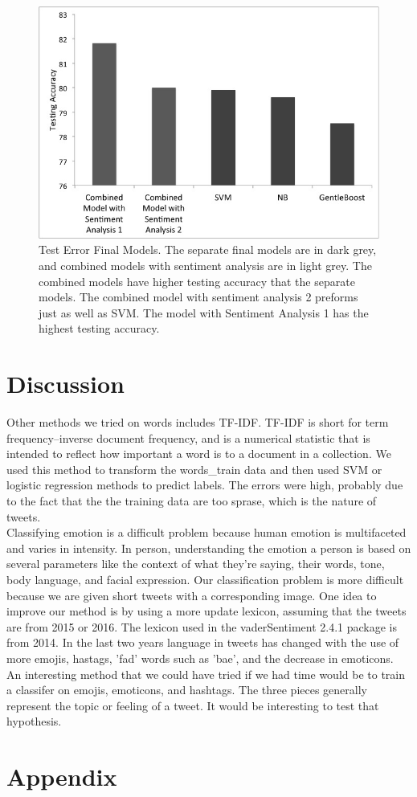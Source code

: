 \documentclass[]{article}
\begin{document}
\begin{figure}
	\centering
  \includegraphics[scale=0.4]{FinalGraph.jpg}
  \caption{Test Error Final Models. The separate final models are in dark grey, and combined models with sentiment analysis are in light grey. The combined models have higher testing accuracy that the separate models. The combined model with sentiment analysis 2 preforms just as well as SVM. The model with Sentiment Analysis 1 has the highest testing accuracy.}
  \label{fig:Test Error}
\end{figure}

\section{Discussion}

Other methods we tried on words includes TF-IDF. TF-IDF is short for term frequency–inverse document frequency, and is a numerical statistic that is intended to reflect how important a word is to a document in a collection. We used this method to transform the words\_train data and then used SVM or logistic regression methods to predict labels. The errors were high, probably due to the fact that the the training data are too sprase, which is the nature of tweets.  \\

Classifying emotion is a difficult problem because human emotion is multifaceted and varies in intensity. In person, understanding the emotion a person is based on several parameters like the context of what they're saying, their words, tone, body language, and facial expression. Our classification problem is more difficult because we are given short tweets with a corresponding image. One idea to improve our method is by using a more update lexicon, assuming that the tweets are from 2015 or 2016. The lexicon used in the vaderSentiment 2.4.1 package is from 2014. In the last two years language in tweets has changed with the use of more emojis, hastags, 'fad' words such as 'bae', and the decrease in emoticons. An interesting method that we could have tried if we had time would be to train a classifer on emojis, emoticons, and hashtags. The three pieces generally represent the topic or feeling of a tweet. It would be interesting to test that hypothesis. 
\section{Appendix}


\end{document}
